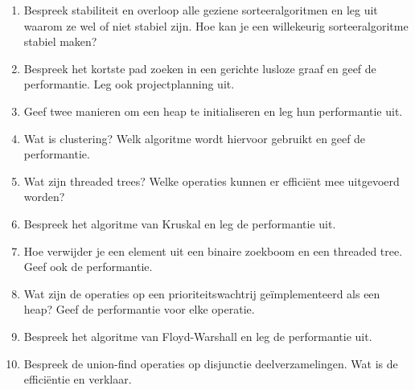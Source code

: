 \documentclass{article}
\begin{document}
\begin{enumerate}
 \item Bespreek stabiliteit en overloop alle geziene sorteeralgoritmen en leg uit waarom ze wel of niet stabiel zijn. Hoe kan je een willekeurig sorteeralgoritme stabiel maken?
 
 \item Bespreek het kortste pad zoeken in een gerichte lusloze graaf en geef de performantie. Leg ook projectplanning uit.
 
 \item Geef twee manieren om een heap te initialiseren en leg hun performantie uit.
 
 \item Wat is clustering? Welk algoritme wordt hiervoor gebruikt en geef de performantie.
 
 \item Wat zijn threaded trees? Welke operaties kunnen er effici\"ent mee uitgevoerd worden?
 
 \item Bespreek het algoritme van Kruskal en leg de performantie uit.
 
 \item Hoe verwijder je een element uit een binaire zoekboom en een threaded tree. Geef ook de performantie.
 
 \item Wat zijn de operaties op een prioriteitswachtrij ge\"implementeerd als een heap? Geef de performantie voor elke operatie.
 
 \item Bespreek het algoritme van Floyd-Warshall en leg de performantie uit.
 
 \item Bespreek de union-find operaties op disjunctie deelverzamelingen. Wat is de effici\"entie en verklaar.
\end{enumerate}
\end{document}
